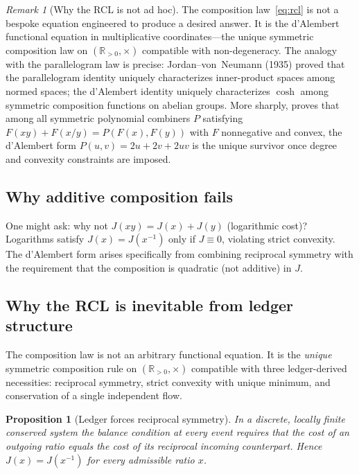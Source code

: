 \documentclass[11pt]{article}
\newcommand{\Rp}{\mathbb{R}_{>0}}
\newtheorem{proposition}[theorem]{Proposition}
\theoremstyle{definition}
\theoremstyle{remark}
\newtheorem{remark}[theorem]{Remark}
\begin{document}
\begin{remark}[Why the RCL is not ad hoc]\label{rem:not-adhoc}
The composition law~\eqref{eq:rcl} is not a bespoke equation
engineered to produce a desired answer.
It is the d'Alembert functional equation in multiplicative
coordinates---the unique symmetric composition law on
$(\Rp, \times)$ compatible with non-degeneracy.
The analogy with the parallelogram law is precise:
Jordan--von~Neumann (1935) proved that the parallelogram identity
uniquely characterizes inner-product spaces among normed spaces;
the d'Alembert identity uniquely characterizes $\cosh$ among
symmetric composition functions on abelian groups.
More sharply, \cite{Inevitability2026} proves that among all
symmetric polynomial combiners $P$ satisfying
$F(xy) + F(x/y) = P(F(x), F(y))$ with $F$ nonnegative and convex,
the d'Alembert form $P(u,v) = 2u + 2v + 2uv$ is the unique
survivor once degree and convexity constraints are imposed.
\end{remark}

\subsection{Why additive composition fails}

One might ask: why not $J(xy) = J(x) + J(y)$ (logarithmic cost)?
Logarithms satisfy $J(x) = J(x^{-1})$ only if $J \equiv 0$,
violating strict convexity.
The d'Alembert form arises specifically from combining reciprocal
symmetry with the requirement that the composition is quadratic
(not additive) in $J$.

\subsection{Why the RCL is inevitable from ledger structure}
\label{sec:rcl-inevitable}

The composition law is not an arbitrary functional equation.
It is the \emph{unique} symmetric composition rule on
$(\Rp, \times)$ compatible with three ledger-derived
necessities: reciprocal symmetry, strict convexity with unique
minimum, and conservation of a single independent flow.

\begin{proposition}[Ledger forces reciprocal symmetry]
\label{prop:ledger-recip}
In a discrete, locally finite conserved system the balance
condition at every event requires that the cost of an outgoing
ratio equals the cost of its reciprocal incoming counterpart.
Hence $J(x) = J(x^{-1})$ for every admissible ratio $x$.
\end{proposition}
\end{document}
